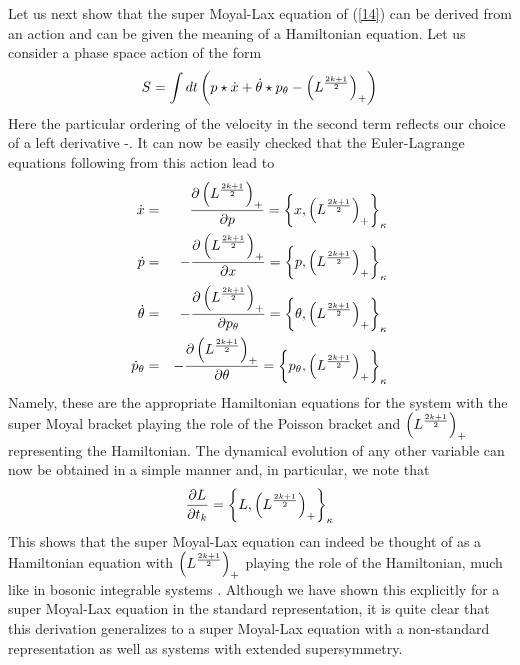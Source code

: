 \documentclass[a4paper,11pt]{article}
\begin{document}
Let us next show that the super Moyal-Lax equation of
(\ref{14}) can be derived from an action and can be given the meaning
of a Hamiltonian equation. Let us consider a phase space action of
the form
\begin{equation}
S = \int dt \left(p\star \dot{x} + \dot{\theta}\star p_{\theta} -
\left(L^{2k+1\over 2}\right)_{+}\right)
\end{equation}
Here the particular ordering of the velocity in the second term
reflects our choice of a left derivative \cite{18}-\cite{19}. It can
now be  easily checked
that the Euler-Lagrange equations following from this action lead to
\begin{eqnarray}
\dot{x} & = & {\partial \left(L^{2k+1\over 2}\right)_{+}\over \partial
p} = \left\{x,\left(L^{2k+1\over
2}\right)_{+}\right\}_{\kappa}\nonumber\\
\dot{p} & = & -  {\partial \left(L^{2k+1\over 2}\right)_{+}\over \partial
x} = \left\{p,\left(L^{2k+1\over
2}\right)_{+}\right\}_{\kappa}\nonumber\\
\dot{\theta} & = & - {\partial \left(L^{2k+1\over 2}\right)_{+}\over \partial
p_{\theta}} = \left\{\theta ,\left(L^{2k+1\over
2}\right)_{+}\right\}_{\kappa}\nonumber\\
\dot{p}_{\theta} & = & - {\partial \left(L^{2k+1\over
2}\right)_{+}\over \partial \theta} = \left\{p_{\theta},\left(L^{2k+1\over
2}\right)_{+}\right\}_{\kappa}
\end{eqnarray}
Namely, these are the appropriate Hamiltonian equations for the system
with the super Moyal bracket playing the role of the Poisson bracket
and $\left(L^{2k+1\over 2}\right)_{+}$ representing the
Hamiltonian. The dynamical evolution of any other variable can now be
obtained in a simple manner and, in particular, we note that
\begin{equation}
{\partial L\over \partial t_{k}} = \left\{L, \left(L^{2k+1\over
2}\right)_{+}\right\}_{\kappa}
\end{equation}
This shows that the super Moyal-Lax equation can indeed be thought of
as a Hamiltonian equation with $\left(L^{2k+1\over 2}\right)_{+}$ playing
the role of the Hamiltonian, much like in bosonic integrable systems
\cite{13}.  Although we have shown this explicitly
for a super Moyal-Lax equation in the standard representation, it is
quite clear that this derivation generalizes to a super Moyal-Lax
equation  with a non-standard representation as well as systems
with extended supersymmetry.
\end{document}

